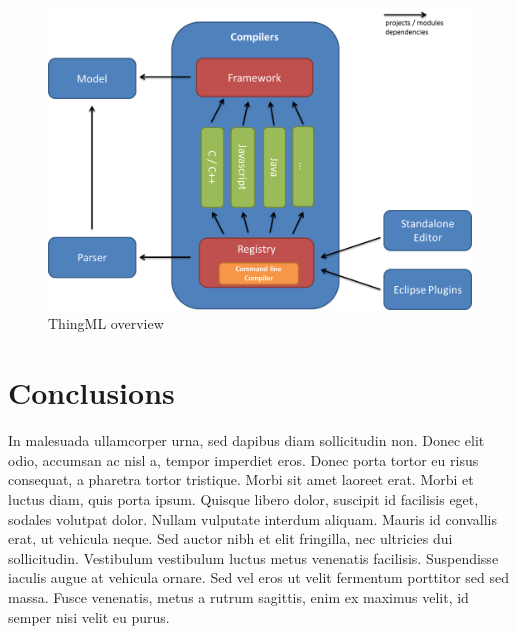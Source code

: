 \documentclass{article}
\begin{document}
\begin{figure}[h!]
	\includegraphics[width=\linewidth]{dsl.png}
	\caption{ThingML overview}
  	\label{fig:thingml} 
\end{figure}




\section{Conclusions}


In malesuada ullamcorper urna, sed dapibus diam sollicitudin non. Donec elit odio, accumsan ac nisl a, tempor imperdiet eros. Donec porta tortor eu risus consequat, a pharetra tortor tristique. Morbi sit amet laoreet erat. Morbi et luctus diam, quis porta ipsum. Quisque libero dolor, suscipit id facilisis eget, sodales volutpat dolor. Nullam vulputate interdum aliquam. Mauris id convallis erat, ut vehicula neque. Sed auctor nibh et elit fringilla, nec ultricies dui sollicitudin. Vestibulum vestibulum luctus metus venenatis facilisis. Suspendisse iaculis augue at vehicula ornare. Sed vel eros ut velit fermentum porttitor sed sed massa. Fusce venenatis, metus a rutrum sagittis, enim ex maximus velit, id semper nisi velit eu purus.

\printbibliography
\end{document}
